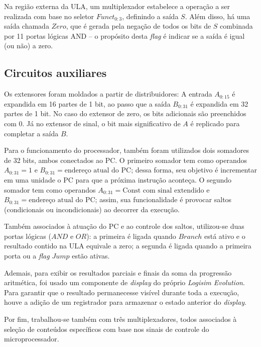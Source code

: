\documentclass[twocolumn, 11pt]{article}
\begin{document}
Na região externa da ULA, um multiplexador estabelece a operação a ser realizada com base no seletor $Funct_{0:3}$, definindo a saída $S$. Além disso, há uma saída chamada $Zero$, que é gerada pela negação de todos os bits de $S$ combinada por 11 portas lógicas AND -- o propósito desta \textit{flag} é indicar se a saída é igual (ou não) a zero.

\subsection{Circuitos auxiliares}

Os extensores foram moldados a partir de distribuidores: A entrada $A_{0:15}$ é expandida em 16 partes de 1 bit, ao passo que a saída $B_{0:31}$ é expandida em 32 partes de 1 bit. No caso do extensor de zero, os bits adicionais são preenchidos com 0. Já no extensor de sinal, o bit mais significativo de $A$ é replicado para completar a saída $B$.

Para o funcionamento do processador, também foram utilizados dois somadores de 32 bits, ambos conectados ao PC. O primeiro somador tem como operandos $A_{0:31} = 1$ e $B_{0:31} = \text{endereço atual do PC}$; dessa forma, seu objetivo é incrementar em uma unidade o PC para que a próxima instrução aconteça. O segundo somador tem como operandos $A_{0:31} = \text{Const com sinal extendido}$ e $B_{0:31} = \text{endereço atual do PC}$; assim, sua funcionalidade é provocar saltos (condicionais ou incondicionais) ao decorrer da execução.

Também associados à atuação do PC e ao controle dos saltos, utilizou-se duas portas lógicas ($AND$ e $OR$): a primeira é ligada quando $Branch$ está ativo e o resultado contido na ULA equivale a zero; a segunda é ligada quando a primeira porta ou a \textit{flag} $Jump$ estão ativas.

Ademais, para exibir os resultados parciais e finais da soma da progressão aritmética, foi usado um componente de \textit{display} do próprio \textit{Logisim Evolution}. Para garantir que o resultado permanecesse visível durante toda a execução, houve a adição de um registrador para armazenar o estado anterior do \textit{display}.

Por fim, trabalhou-se também com três multiplexadores, todos associados à seleção de conteúdos específicos com base nos sinais de controle do microprocessador.
\end{document}
